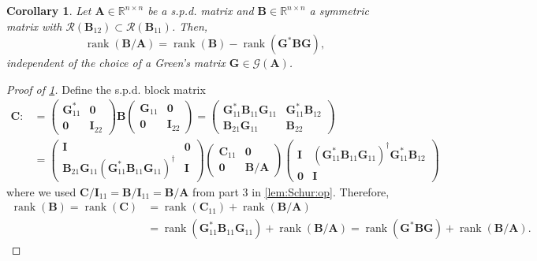 \documentclass[noinfoline]{imsart}\setcounter{tocdepth}{2}
\renewcommand{\b}[1]{\mathbb{#1}} %
\newcommand{\m}[1]{\mathbf{#1}} %
\renewcommand{\c}[1]{\mathcal{#1}} %
\DeclareMathOperator*{\rk}{rank}
\theoremstyle{plain}
\newtheorem{corollary}[theorem]{Corollary}
\begin{document}
\begin{corollary}\label{cor:Schur:rank}
Let $\m{A} \in \b{R}^{n \times n}$ be a s.p.d. matrix and $\m{B} \in \b{R}^{n \times n}$ a symmetric matrix with $\c{R}(\m{B}_{12}) \subset \c{R}(\m{B}_{11})$. Then,
\begin{equation*}
    \rk(\m{B}/\m{A}) = \rk(\m{B}) - \rk(\m{G}^{*} \m{B} \m{G}),
\end{equation*}
independent of the choice of a Green's matrix $\m{G} \in \c{G}(\m{A})$.
\end{corollary}
\begin{proof}[Proof of \cref{cor:Schur:rank}]
Define the s.p.d. block matrix
\begin{align*}
    \m{C} :&= \begin{pmatrix}
        \m{G}_{11}^{*} & \m{0} \\
        \m{0} & \m{I}_{22}
    \end{pmatrix}
    \m{B} \begin{pmatrix}
        \m{G}_{11} & \m{0} \\
        \m{0} & \m{I}_{22}
    \end{pmatrix} = \begin{pmatrix}
        \m{G}_{11}^{*} \m{B}_{11} \m{G}_{11} & \m{G}_{11}^{*} \m{B}_{12} \\
        \m{B}_{21} \m{G}_{11} & \m{B}_{22}
    \end{pmatrix} \\
    &= \begin{pmatrix}
        \m{I} & \m{0} \\
        \m{B}_{21} \m{G}_{11} (\m{G}_{11}^{*} \m{B}_{11} \m{G}_{11})^{\dagger} & \m{I}
    \end{pmatrix}
    \begin{pmatrix}
        \m{C}_{11} & \m{0} \\
        \m{0} & \m{B}/\m{A}
    \end{pmatrix} \begin{pmatrix}
        \m{I} & (\m{G}_{11}^{*} \m{B}_{11} \m{G}_{11})^{\dagger} \m{G}_{11}^{*} \m{B}_{12} \\
        \m{0} & \m{I}
    \end{pmatrix}
\end{align*}
where we used $\m{C}/\m{I}_{11} = \m{B}/\m{I}_{11} = \m{B}/\m{A}$ from part 3 in \cref{lem:Schur:op}. Therefore,
\begin{align*}
    \rk(\m{B}) = \rk(\m{C}) &= \rk(\m{C}_{11}) + \rk (\m{B}/\m{A}) \\
    &= \rk(\m{G}_{11}^{*} \m{B}_{11} \m{G}_{11}) + \rk (\m{B}/\m{A})
    = \rk(\m{G}^{*} \m{B} \m{G}) + \rk (\m{B}/\m{A}).
\end{align*}
\end{proof}
\end{document}
